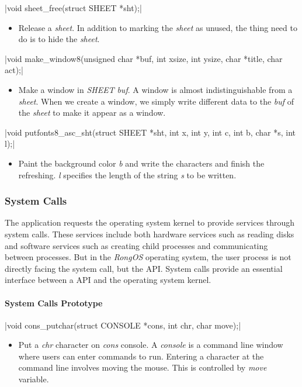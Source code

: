 \documentclass{swfcthesis}
\begin{document}
\csingle|void sheet_free(struct SHEET *sht);|
\begin{itemize}
\item Release a \emph{sheet}. In addition to marking the \emph{sheet} as unused, the
  thing need  to do is to hide the \emph{sheet}.
\end{itemize}

\csingle|void make_window8(unsigned char *buf, int xsize, int ysize, char *title, char act);|
\begin{itemize}
\item Make a window in \emph{SHEET} \emph{buf}. A window is almost indistinguishable from
  a \emph{sheet}. When we create a window, we simply write different data to the
  \emph{buf} of the \emph{sheet} to make it appear as a window.
  
\end{itemize}

\csingle|void putfonts8_asc_sht(struct SHEET *sht, int x, int y, int c, int b, char *s, int l);|
\begin{itemize}
\item Paint the background color \emph{b} and write the characters and finish the
  refreshing. \emph{l} specifies the length of the string \emph{s} to be written.
    
\end{itemize}

\subsubsection{System Calls}
\label{sec:system-call}

The application requests the operating system kernel to provide services through system
calls. These services include both hardware services such as reading disks and software
services such as creating child processes and communicating between processes. But in the
\emph{RongOS} operating system, the user process is not directly facing the system call,
but the API. System calls provide an essential interface between a API and the operating
system kernel.


\paragraph{System Calls Prototype}

\csingle|void cons_putchar(struct CONSOLE *cons, int chr, char move);|
\begin{itemize}
\item Put a \emph{chr} character on \emph{cons} console. A \emph{console} is a command line
  window where users can enter commands to run. Entering a character at the command line
  involves moving the mouse. This is controlled by \emph{move} variable.
  
\end{itemize}
\end{document}
